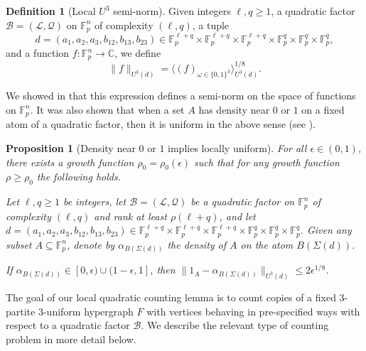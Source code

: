 \documentclass[12pt,oneside,british,a4wide]{amsart}
\newtheorem{proposition}[theorem]{Proposition}
\numberwithin{equation}{section}
\theoremstyle{definition}
\newtheorem{definition}[theorem]{Definition}
\def\C{\mathbb{C}}
\def\F{\mathbb{F}}
\def\e{\epsilon}
\def\ra{\rightarrow}
\newcommand{\calL}{\mathcal{L}}
\newcommand{\calB}{\mathcal{B}}
\newcommand{\calQ}{\mathcal{Q}}
\begin{document}
\begin{definition}[Local $U^3$ semi-norm]\label{def:localu3}
Given integers $\ell,q\geq 1$, a quadratic factor $\calB=(\calL,\calQ)$ on $\F_p^n$ of complexity $(\ell,q)$, a tuple 
$$
d=(a_1,a_2,a_3,b_{12},b_{13},b_{23})\in \F_p^{\ell+q}\times \F_p^{\ell+q}\times \F_p^{\ell+q}\times \F_p^q\times \F_p^q\times \F_p^q,
$$
 and  a function $f:\F_p^n\ra \C$, we define
\[\|f\|_{U^3(d)}= \langle (f)_{\omega\in \{0,1\}^3}\rangle_{U^3(d)}^{1/8}.\]
\end{definition}

We showed in \cite[Lemma 3.16]{Terry.2021d} that this expression defines a semi-norm on the space of functions on $\F_p^n$.  It was also shown that when a set $A$ has density near $0$ or $1$ on a fixed atom of a quadratic factor, then it is uniform in the above sense (see \cite[Proposition 3.20]{Terry.2021d}).  
 

\begin{proposition}[Density near $0$ or $1$ implies locally uniform]\label{prop:locsparseuni}
For all $\e\in (0,1)$, there exists a growth function $\rho_0=\rho_0(\e)$ such that for any growth function $\rho\geq \rho_0$   the following holds. 

Let $\ell,q\geq1$ be integers, let $\calB=(\calL,\calQ)$ be a quadratic factor on $\F_p^n$ of complexity $(\ell,q)$ and rank at least $\rho(\ell+q)$, and let $d=(a_1,a_2,a_3,b_{12},b_{13},b_{23})\in  \F_p^{\ell+q}\times \F_p^{\ell+q}\times \F_p^{\ell+q}\times\F_p^q\times \F_p^q\times \F_p^q$. Given any subset $A\subseteq \F_p^n$, denote by $\alpha_{B(\Sigma(d))}$ the density of $A$ on the atom $B(\Sigma(d))$.

If $\alpha_{B(\Sigma(d))}\in[0,\e)\cup(1-\e,1]$, then $\|1_A-\alpha_{B(\Sigma(d))}\|_{U^{3}(d)}\leq 2\e^{1/8}$. 
\end{proposition}

 

The goal of our local quadratic counting lemma is to  count copies of a fixed $3$-partite $3$-uniform hypergraph $F$ with vertices behaving in pre-specified ways with respect to a quadratic factor $\calB$.  We describe the relevant type of counting problem in more detail below.  
\end{document}
